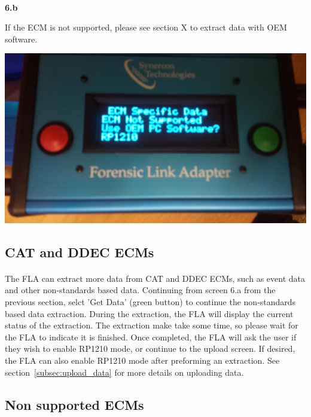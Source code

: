 \documentclass[11pt]{article}
\begin{document}
\\[\baselineskip]
\noindent\begin{minipage}{0.3\textwidth}%
\begin{center}
\textbf{6.b}\\[\baselineskip]
\end{center}
If the ECM is not supported, please see section X to extract data with OEM software.
\end{minipage}%
\hfill%
\begin{minipage}{0.6\textwidth}
\includegraphics[width=\linewidth]{../media/fla_screens/ecm_not_supported}
\end{minipage}

\subsection{CAT and DDEC ECMs}
\paragraph{  }
The FLA can extract more data from CAT and DDEC ECMs, such as event data and other non-standards based data. Continuing from screen 6.a from the previous section, selct 'Get Data' (green button) to continue the non-standards based data extraction. During the extraction, the FLA will display the current status of the extraction. The extraction make take some time, so please wait for the FLA to indicate it is finished. Once completed, the FLA will ask the user if they wish to enable RP1210 mode, or continue to the upload screen. If desired, the FLA can also enable RP1210 mode after preforming an extraction. See section~\ref{subsec:upload_data} for more details on uploading data.

\subsection{Non supported ECMs}
\end{document}
